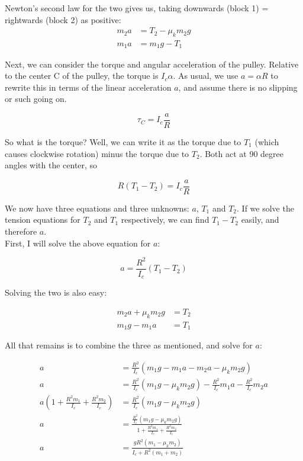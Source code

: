 \documentclass[8.01x]{subfiles}
\begin{document}
Newton's second law for the two gives us, taking downwards (block 1) = rightwards (block 2) as positive:
\begin{align}
m_2 a &= T_2 - \mu_k m_2 g\\
m_1 a &= m_1 g - T_1
\end{align}

Next, we can consider the torque and angular acceleration of the pulley. Relative to the center C of the pulley, the torque is $I_c \alpha$. As usual, we use $a = \alpha R$ to rewrite this in terms of the linear acceleration $a$, and assume there is no slipping or such going on.

\begin{equation}
\tau_C = I_c \frac{a}{R}
\end{equation}

So what is the torque? Well, we can write it as the torque due to $T_1$ (which causes clockwise rotation) minus the torque due to $T_2$. Both act at 90 degree angles with the center, so

\begin{equation}
R (T_1 - T_2) = I_c \frac{a}{R}
\end{equation}

We now have three equations and three unknowns: $a$, $T_1$ and $T_2$.
If we solve the tension equations for $T_2$ and $T_1$ respectively, we can find $T_1 - T_2$ easily, and therefore $a$.\\
First, I will solve the above equation for $a$:

\begin{equation}
a = \frac{R^2}{I_c} (T_1 - T_2)
\end{equation}

Solving the two is also easy:

\begin{align}
m_2 a + \mu_k m_2 g &= T_2\\
m_1 g - m_1 a &= T_1
\end{align}

All that remains is to combine the three as mentioned, and solve for $a$:

\begin{align}
a &= \frac{R^2}{I_c} (m_1 g - m_1 a - m_2 a - \mu_k m_2 g)\\
a &= \frac{R^2}{I_c} (m_1 g - \mu_k m_2 g) - \frac{R^2}{I_c} m_1 a - \frac{R^2}{I_c} m_2 a\\
a \left(1 +\frac{R^2 m_1}{I_c} + \frac{R^2 m_2}{I_c}\right) &= \frac{R^2}{I_c} (m_1 g - \mu_k m_2 g)\\
a &= \frac{\frac{R^2}{I_c} (m_1 g - \mu_k m_2 g)}{1 +\frac{R^2 m_1}{I_c} + \frac{R^2 m_2}{I_c}}\\
a &= \frac{g R^2 (m_1 - \mu_k m_2)}{I_c + R^2 (m_1 + m_2)}
\end{align}
\end{document}
